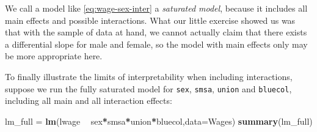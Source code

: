 \documentclass[]{book}
\newenvironment{Shaded}{\begin{snugshade}}{\end{snugshade}}
\newcommand{\KeywordTok}[1]{\textcolor[rgb]{0.13,0.29,0.53}{\textbf{#1}}}
\newcommand{\DataTypeTok}[1]{\textcolor[rgb]{0.13,0.29,0.53}{#1}}
\newcommand{\StringTok}[1]{\textcolor[rgb]{0.31,0.60,0.02}{#1}}
\newcommand{\OperatorTok}[1]{\textcolor[rgb]{0.81,0.36,0.00}{\textbf{#1}}}
\newcommand{\NormalTok}[1]{#1}
\theoremstyle{definition}
\theoremstyle{definition}
\theoremstyle{definition}
\theoremstyle{remark}
\begin{document}
We call a model like \eqref{eq:wage-sex-inter} a \emph{saturated model},
because it includes all main effects and possible interactions. What our
little exercise showed us was that with the sample of data at hand, we
cannot actually claim that there exists a differential slope for male
and female, so the model with main effects only may be more appropriate
here.

To finally illustrate the limits of interpretability when including
interactions, suppose we run the fully saturated model for \texttt{sex},
\texttt{smsa}, \texttt{union} and \texttt{bluecol}, including all main
and all interaction effects:

\begin{Shaded}
\begin{Highlighting}[]
\NormalTok{lm_full =}\StringTok{ }\KeywordTok{lm}\NormalTok{(lwage }\OperatorTok{~}\StringTok{ }\NormalTok{sex}\OperatorTok{*}\NormalTok{smsa}\OperatorTok{*}\NormalTok{union}\OperatorTok{*}\NormalTok{bluecol,}\DataTypeTok{data=}\NormalTok{Wages)}
\KeywordTok{summary}\NormalTok{(lm_full)}
\end{Highlighting}
\end{Shaded}
\end{document}
